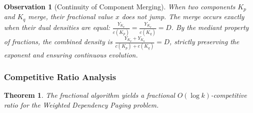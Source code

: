 \documentclass[a4paper]{article}
\newtheorem{theorem}{Theorem}    %
\newtheorem{observation}{Observation} %
\begin{document}
\begin{observation}[Continuity of Component Merging]
When two components $K_p$ and $K_q$ merge, their fractional value $x$ does not jump. The merge occurs exactly when their dual densities are equal: $\frac{Y_{K_p}}{c(K_p)} = \frac{Y_{K_q}}{c(K_q)} = D$. By the mediant property of fractions, the combined density is $\frac{Y_{K_p} + Y_{K_q}}{c(K_p) + c(K_q)} = D$, strictly preserving the exponent and ensuring continuous evolution.
\end{observation}

\subsubsection{Competitive Ratio Analysis}

\begin{theorem}
The fractional algorithm yields a fractional $O(\log k)$-competitive ratio for the Weighted Dependency Paging problem.
\end{theorem}
\end{document}

